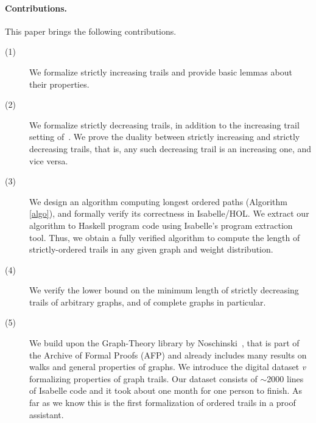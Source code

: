 \begin{isabellebody}
\begin{isamarkuptext}
\noindent\paragraph{\bf Contributions.} This paper brings the following contributions.
\begin{description}
\item[(1)]
We formalize strictly increasing trails and provide basic lemmas about their
properties.
\item[(2)] We formalize strictly decreasing trails, in addition to the increasing trail setting of~\cite{graham1973increasing}. 
We prove the duality between strictly increasing and strictly decreasing trails, that is, any such decreasing trail is an increasing one, and vice versa.
\item[(3)] We design an algorithm computing longest ordered paths (Algorithm \ref{algo}), and formally verify  its correctness in Isabelle/HOL.
We extract our algorithm to Haskell program code using Isabelle's program extraction tool. Thus, we obtain a fully verified algorithm to compute the length
of strictly-ordered trails in any given graph and weight distribution.
\item[(4)] We
verify the lower bound on
the minimum length of strictly decreasing trails of arbitrary graphs, and of complete graphs in particular.
\item[(5)] We build upon the Graph-Theory library by Noschinski~\cite{Graph_Theory-AFP},  that is part of the
Archive of Formal Proofs (AFP) and already includes many results on walks and
general properties of graphs. We introduce the digital dataset {\it v} formalizing properties of graph trails. Our dataset  consists of
$\sim$2000 lines of Isabelle code and it took about one month for one person to finish. As far as we know this is the first formalization of
ordered trails in a proof assistant.
\end{description}


\end{isamarkuptext}
\end{isabellebody}

